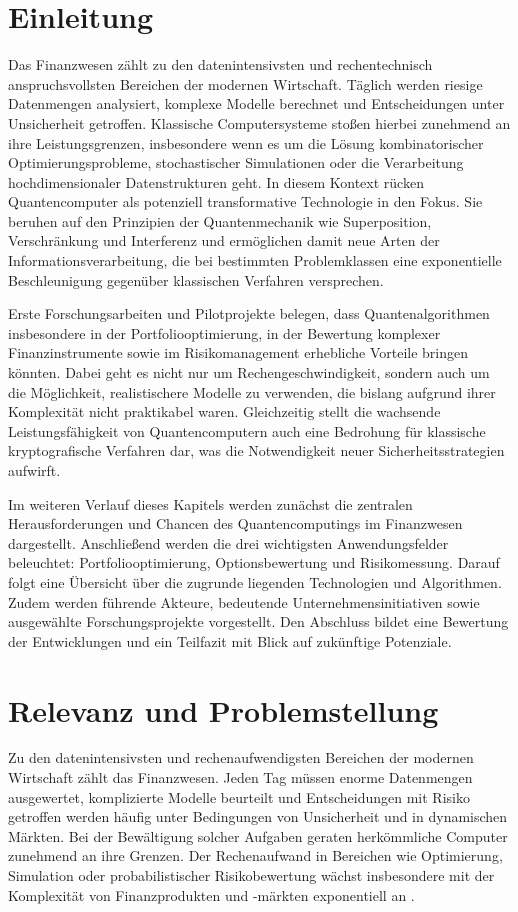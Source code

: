 \section{Einleitung}
Das Finanzwesen zählt zu den datenintensivsten und rechentechnisch anspruchsvollsten Bereichen der modernen Wirtschaft. Täglich werden riesige Datenmengen analysiert, komplexe Modelle berechnet und Entscheidungen unter Unsicherheit getroffen. Klassische Computersysteme stoßen hierbei zunehmend an ihre Leistungsgrenzen, insbesondere wenn es um die Lösung kombinatorischer Optimierungsprobleme, stochastischer Simulationen oder die Verarbeitung hochdimensionaler Datenstrukturen geht. In diesem Kontext rücken Quantencomputer als potenziell transformative Technologie in den Fokus. Sie beruhen auf den Prinzipien der Quantenmechanik wie Superposition, Verschränkung und Interferenz und ermöglichen damit neue Arten der Informationsverarbeitung, die bei bestimmten Problemklassen eine exponentielle Beschleunigung gegenüber klassischen Verfahren versprechen.

Erste Forschungsarbeiten und Pilotprojekte belegen, dass Quantenalgorithmen insbesondere in der Portfoliooptimierung, in der Bewertung komplexer Finanzinstrumente sowie im Risikomanagement erhebliche Vorteile bringen könnten. Dabei geht es nicht nur um Rechengeschwindigkeit, sondern auch um die Möglichkeit, realistischere Modelle zu verwenden, die bislang aufgrund ihrer Komplexität nicht praktikabel waren. Gleichzeitig stellt die wachsende Leistungsfähigkeit von Quantencomputern auch eine Bedrohung für klassische kryptografische Verfahren dar, was die Notwendigkeit neuer Sicherheitsstrategien aufwirft.

Im weiteren Verlauf dieses Kapitels werden zunächst die zentralen Herausforderungen und Chancen des Quantencomputings im Finanzwesen dargestellt. Anschließend werden die drei wichtigsten Anwendungsfelder beleuchtet: Portfoliooptimierung, Optionsbewertung und Risikomessung. Darauf folgt eine Übersicht über die zugrunde liegenden Technologien und Algorithmen. Zudem werden führende Akteure, bedeutende Unternehmensinitiativen sowie ausgewählte Forschungsprojekte vorgestellt. Den Abschluss bildet eine Bewertung der Entwicklungen und ein Teilfazit mit Blick auf zukünftige Potenziale.

\section{Relevanz und Problemstellung}
Zu den datenintensivsten und rechenaufwendigsten Bereichen der modernen Wirtschaft zählt das Finanzwesen. Jeden Tag müssen enorme Datenmengen ausgewertet, komplizierte Modelle beurteilt und Entscheidungen mit Risiko getroffen werden   häufig unter Bedingungen von Unsicherheit und in dynamischen Märkten. Bei der Bewältigung solcher Aufgaben geraten herkömmliche Computer zunehmend an ihre Grenzen. Der Rechenaufwand in Bereichen wie Optimierung, Simulation oder probabilistischer Risikobewertung wächst insbesondere mit der Komplexität von Finanzprodukten und -märkten exponentiell an \cite{springer2025,plos2024}.

